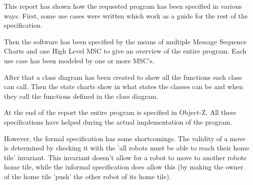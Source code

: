 This report has shown how the requested program has been specified in various ways. First, some use cases were written which work as a guide for the rest of the specification.

Then the software has been specified by the means of multiple Message Sequence Charts and one High Level MSC to give an overview of the entire program. Each use case has been modeled by one or more MSC's.

After that a class diagram has been created to show all the functions each class can call. Then the state charts show in what states the classes can be and when they call the functions defined in the class diagram.

At the end of the report the entire program is specified in Object-Z. All these specifications have helped during the actual implementation of the program.


However, the formal specification has some shortcomings. The validity of a move is determined by checking it with the 'all robots must be able to reach their home tile' invariant. This invariant doesn't allow for a robot to move to another robots home tile, while the informal specification does allow this (by making the owner of the home tile 'push' the other robot of its home tile).
